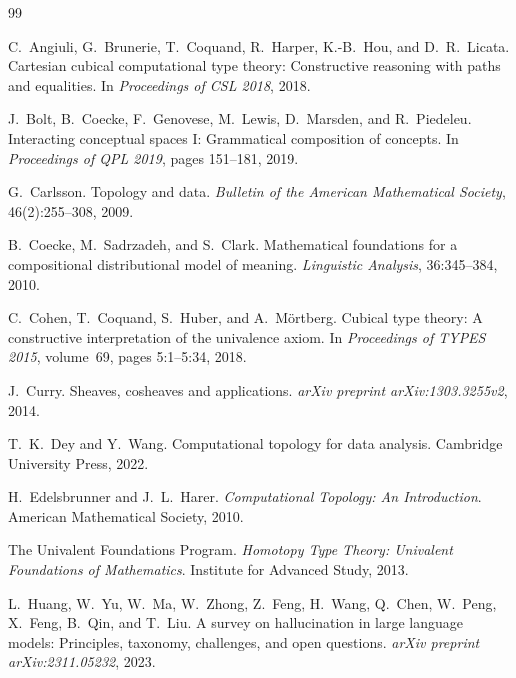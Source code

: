 \documentclass[11pt,a4paper]{article}
\theoremstyle{plain}
\theoremstyle{definition}
\theoremstyle{remark}
\begin{document}
\begin{thebibliography}{99}

C.~Angiuli, G.~Brunerie, T.~Coquand, R.~Harper, K.-B.~Hou, and D.~R.~Licata.
\newblock Cartesian cubical computational type theory: Constructive reasoning with paths and equalities.
\newblock In \emph{Proceedings of CSL 2018}, 2018.

J.~Bolt, B.~Coecke, F.~Genovese, M.~Lewis, D.~Marsden, and R.~Piedeleu.
\newblock Interacting conceptual spaces I: Grammatical composition of concepts.
\newblock In \emph{Proceedings of QPL 2019}, pages 151--181, 2019.

G.~Carlsson.
\newblock Topology and data.
\newblock \emph{Bulletin of the American Mathematical Society}, 46(2):255--308, 2009.

B.~Coecke, M.~Sadrzadeh, and S.~Clark.
\newblock Mathematical foundations for a compositional distributional model of meaning.
\newblock \emph{Linguistic Analysis}, 36:345--384, 2010.

C.~Cohen, T.~Coquand, S.~Huber, and A.~M\"ortberg.
\newblock Cubical type theory: A constructive interpretation of the univalence axiom.
\newblock In \emph{Proceedings of TYPES 2015}, volume~69, pages 5:1--5:34, 2018.

J.~Curry.
\newblock Sheaves, cosheaves and applications.
\newblock \emph{arXiv preprint arXiv:1303.3255v2}, 2014.

T.~K.~Dey and Y.~Wang.
\newblock Computational topology for data analysis.
\newblock Cambridge University Press, 2022.

H.~Edelsbrunner and J.~L.~Harer.
\newblock \emph{Computational Topology: An Introduction}.
\newblock American Mathematical Society, 2010.

The Univalent Foundations Program.
\newblock \emph{Homotopy Type Theory: Univalent Foundations of Mathematics}.
\newblock Institute for Advanced Study, 2013.

L.~Huang, W.~Yu, W.~Ma, W.~Zhong, Z.~Feng, H.~Wang, Q.~Chen, W.~Peng, X.~Feng, B.~Qin, and T.~Liu.
\newblock A survey on hallucination in large language models: Principles, taxonomy, challenges, and open questions.
\newblock \emph{arXiv preprint arXiv:2311.05232}, 2023.


\end{thebibliography}
\end{document}
